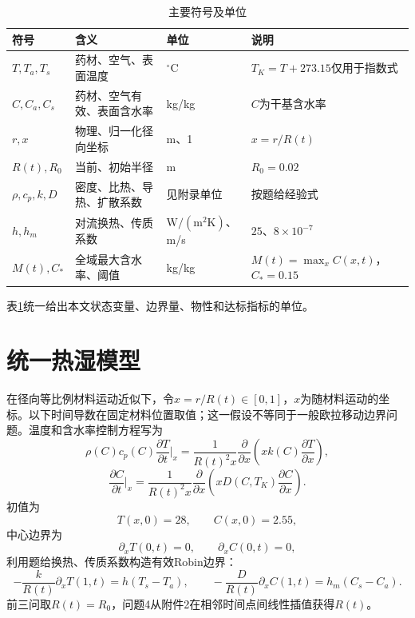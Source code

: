 \documentclass[UTF8,12pt,a4paper]{ctexart}
\begin{document}
\begin{table}[H]\centering\small\caption{主要符号及单位}\label{tab:symbols}
\begin{tabular}{p{}p{}p{}p{}}
符号&含义&单位&说明\\
\midrule
$T,T_a,T_s$&药材、空气、表面温度&$^{\circ}\mathrm C$&$T_K=T+273.15$仅用于指数式\\
$C,C_a,C_s$&药材、空气有效、表面含水率&kg/kg&$C$为干基含水率\\
$r,x$&物理、归一化径向坐标&m、1&$x=r/R(t)$\\
$R(t),R_0$&当前、初始半径&m&$R_0=0.02$\\
$\rho,c_p,k,D$&密度、比热、导热、扩散系数&见附录单位&按题给经验式\\
$h,h_m$&对流换热、传质系数&$\mathrm{W/(m^2K)}$、m/s&$25$、$8\times10^{-7}$\\
$M(t),C_*$&全域最大含水率、阈值&kg/kg&$M(t)=\max_xC(x,t)$，$C_*=0.15$\\
\bottomrule
\end{tabular}\end{table}
表\ref{tab:symbols}统一给出本文状态变量、边界量、物性和达标指标的单位。
\section{统一热湿模型}
在径向等比例材料运动近似下，令$x=r/R(t)\in[0,1]$，$x$为随材料运动的坐标。以下时间导数在固定材料位置取值；这一假设不等同于一般欧拉移动边界问题。温度和含水率控制方程写为
\begin{equation}
\rho(C)c_p(C)\frac{\partial T}{\partial t}\bigg|_x
=\frac{1}{R(t)^2x}\frac{\partial}{\partial x}
\left(xk(C)\frac{\partial T}{\partial x}\right),
\end{equation}
\begin{equation}
\frac{\partial C}{\partial t}\bigg|_x
=\frac{1}{R(t)^2x}\frac{\partial}{\partial x}
\left(xD(C,T_K)\frac{\partial C}{\partial x}\right).
\end{equation}
初值为
\begin{equation}
T(x,0)=28,\qquad C(x,0)=2.55,
\end{equation}
中心边界为
\begin{equation}
\partial_xT(0,t)=0,\qquad\partial_xC(0,t)=0,
\end{equation}
利用题给换热、传质系数构造有效Robin边界：
\begin{equation}
-\frac{k}{R(t)}\partial_xT(1,t)=h(T_s-T_a),\qquad
-\frac{D}{R(t)}\partial_xC(1,t)=h_m(C_s-C_a).
\end{equation}
前三问取$R(t)=R_0$，问题4从附件2在相邻时间点间线性插值获得$R(t)$。
\end{document}
